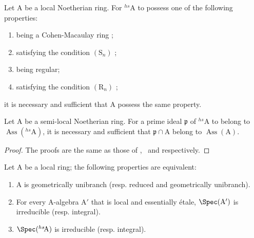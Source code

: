 \begin{corollary}[18.8.13]
\label{IV.18.8.13}
Let $\mathrm{A}$ be a local Noetherian ring.
For ${}^{hs}\!\mathrm{A}$ to possess one of the following properties:
\begin{enumerate}[label=\emph{\alph*)}]
  \item being a Cohen-Macaulay ring ;
  \item satisfying the condition $(\mathrm{S}_n)$ ;
  \item being regular;
  \item satisfying the condition $(\mathrm{R}_n)$ ;
\end{enumerate}
it is necessary and sufficient that A possess the same property.
\end{corollary}

\begin{corollary}[18.8.14]
\label{IV.18.8.14}
Let $\mathrm{A}$ be a semi-local Noetherian ring.
For a prime ideal $\mathfrak{p}$ of ${}^{hs}\!\mathrm{A}$ to belong to $\operatorname{Ass}({}^{hs}\!\mathrm{A})$, it is necessary and sufficient that $\mathfrak{p}\cap\mathrm{A}$ belong to $\operatorname{Ass}(\mathrm{A})$.
\end{corollary}

\begin{proof}
The proofs are the same as those of ,~ and  respectively.
\end{proof}

\begin{proposition}[18.8.15]
\label{IV.18.8.15}
Let $\mathrm{A}$ be a local ring;
the following properties are equivalent:
\begin{enumerate}[label=\emph{\alph*)}]
  \item A is geometrically unibranch (resp. reduced and geometrically unibranch).
  \item For every A-algebra $\mathrm{A}'$ that is local and essentially \'{e}tale, $\Spec(\mathrm{A}')$ is irreducible (resp. integral).
  \item $\Spec({}^{hs}\!\mathrm{A})$ is irreducible (resp. integral).
\end{enumerate}
\end{proposition}


